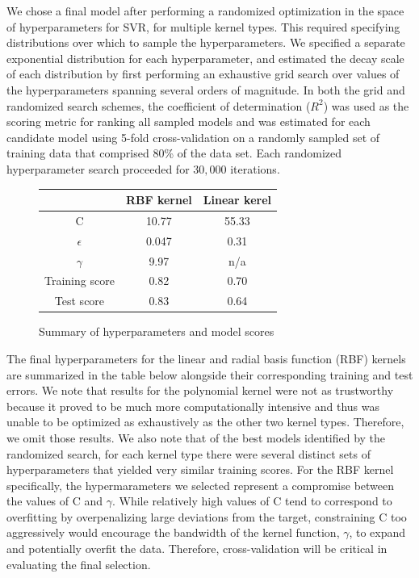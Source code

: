 \documentclass[10]{article}
\begin{document}
We chose a final model after performing a randomized optimization in the space of hyperparameters for SVR, for multiple kernel types. This required specifying distributions over which to sample the hyperparameters. We specified a separate exponential distribution for each hyperparameter, and estimated the decay scale of each distribution by first performing an exhaustive grid search over values of the hyperparameters spanning several orders of magnitude. In both the grid and randomized search schemes, the coefficient of determination ($R^2$) was used as the scoring metric for ranking all sampled models and was estimated for each candidate model using 5-fold cross-validation on a randomly sampled set of training data that comprised 80\% of the data set. Each randomized hyperparameter search proceeded for $30,000$ iterations.\\ 


\begin{figure}
\centering
\begin{tabular}{ |c|c|c| } 
 \hline
       & \textbf{RBF kernel} & \textbf{Linear kerel} \\ 
 \hline
 C              & 10.77 & 55.33 \\ 
 $\epsilon$     & 0.047 & 0.31 \\
 $\gamma$       & 9.97 & n/a \\
 Training score & 0.82 & 0.70 \\
 Test score     & 0.83 & 0.64 \\
 \hline
\end{tabular}
\caption{\label{fig:Results}Summary of hyperparameters and model scores}
\end{figure}

\noindent The final hyperparameters for the linear and radial basis function (RBF) kernels are summarized in the table below alongside their corresponding training and test errors. We note that results for the polynomial kernel were not as trustworthy because it proved to be much more computationally intensive and thus was unable to be optimized as exhaustively as the other two kernel types. Therefore, we omit those results. We also note that of the best models identified by the randomized search, for each kernel type there were several distinct sets of hyperparameters that yielded very similar training scores. For the RBF kernel specifically, the hypermarameters we selected represent a compromise between the values of C and $\gamma$. While relatively high values of C tend to correspond to overfitting by overpenalizing large deviations from the target, constraining C too aggressively would encourage the bandwidth of the kernel function, $\gamma$, to expand and potentially overfit the data. Therefore, cross-validation will be critical in evaluating the final selection.\\  
\end{document}
